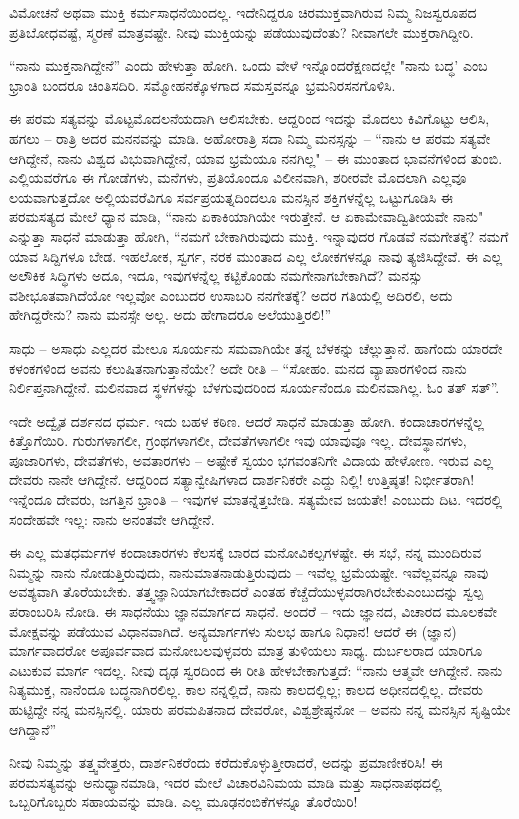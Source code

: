 \vskip 4pt

ವಿಮೋಚನೆ ಅಥವಾ ಮುಕ್ತಿ ಕರ್ಮಸಾಧನೆಯಿಂದಲ್ಲ. ಇದೇನಿದ್ದರೂ ಚಿರಮುಕ್ತವಾಗಿರುವ ನಿಮ್ಮ ನಿಜಸ್ವರೂಪದ ಪ್ರತಿಬೋಧವಷ್ಟೆ, ಸ್ಮರಣೆ ಮಾತ್ರವಷ್ಟೇ. ನೀವು ಮುಕ್ತಿಯನ್ನು ಪಡೆಯುವುದೆಂತು? ನೀವಾಗಲೇ ಮುಕ್ತರಾಗಿದ್ದೀರಿ.

\vskip 4pt

“ನಾನು ಮುಕ್ತನಾಗಿದ್ದೇನೆ” ಎಂದು ಹೇಳುತ್ತಾ ಹೋಗಿ. ಒಂದು ವೇಳೆ ಇನ್ನೊಂದರೆಕ್ಷಣದಲ್ಲೇ "ನಾನು ಬದ್ಧ' ಎಂಬ ಭ್ರಾಂತಿ ಬಂದರೂ ಚಿಂತಿಸದಿರಿ. ಸಮ್ಮೋಹನಕ್ಕೊಳಗಾದ ಸಮಸ್ತವನ್ನೂ ಭ್ರಮನಿರಸನಗೊಳಿಸಿ.

\vskip 4pt

ಈ ಪರಮ ಸತ್ಯವನ್ನು ಮೊಟ್ಟಮೊದಲನೆಯದಾಗಿ ಆಲಿಸಬೇಕು. ಆದ್ದರಿಂದ ಇದನ್ನು ಮೊದಲು ಕಿವಿಗೊಟ್ಟು ಆಲಿಸಿ, ಹಗಲು – ರಾತ್ರಿ ಅದರ ಮನನವನ್ನು ಮಾಡಿ. ಅಹೋರಾತ್ರಿ ಸದಾ ನಿಮ್ಮ ಮನಸ್ಸನ್ನು – “ನಾನು ಆ ಪರಮ ಸತ್ಯವೇ ಆಗಿದ್ದೇನೆ, ನಾನು ವಿಶ್ವದ ವಿಭುವಾಗಿದ್ದೇನೆ, ಯಾವ ಭ್ರಮೆಯೂ ನನಗಿಲ್ಲ" – ಈ ಮುಂತಾದ ಭಾವನೆಗಳಿಂದ ತುಂಬಿ. ಎಲ್ಲಿಯವರೆಗೂ ಈ ಗೋಡೆಗಳು, ಮನೆಗಳು, ಪ್ರತಿಯೊಂದೂ ವಿಲೀನವಾಗಿ, ಶರೀರವೇ ಮೊದಲಾಗಿ ಎಲ್ಲವೂ ಲಯವಾಗುತ್ತದೋ ಅಲ್ಲಿಯವರೆವಿಗೂ ಸರ್ವಪ್ರಯತ್ನದಿಂದಲೂ ಮನಸ್ಸಿನ ಶಕ್ತಿಗಳನ್ನೆಲ್ಲ ಒಟ್ಟುಗೂಡಿಸಿ ಈ ಪರಮಸತ್ಯದ ಮೇಲೆ ಧ್ಯಾನ ಮಾಡಿ, “ನಾನು ಏಕಾಕಿಯಾಗಿಯೇ ಇರುತ್ತೇನೆ. ಆ ಏಕಾಮೇವಾದ್ವಿತೀಯವೇ ನಾನು" ಎನ್ನುತ್ತಾ ಸಾಧನೆ ಮಾಡುತ್ತಾ ಹೋಗಿ, “ನಮಗೆ ಬೇಕಾಗಿರುವುದು ಮುಕ್ತಿ. ಇನ್ನಾವುದರ ಗೊಡವೆ ನಮಗೇತಕ್ಕೆ? ನಮಗೆ ಯಾವ ಸಿದ್ದಿಗಳೂ ಬೇಡ. ಇಹಲೋಕ, ಸ್ವರ್ಗ, ನರಕ ಮುಂತಾದ ಎಲ್ಲ ಲೋಕಗಳನ್ನೂ ನಾವು ತ್ಯಜಿಸಿದ್ದೇವೆ. ಈ ಎಲ್ಲ ಅಲೌಕಿಕ ಸಿದ್ಧಿಗಳು ಅದೂ, ಇದೂ, ಇವುಗಳನ್ನೆಲ್ಲ ಕಟ್ಟಿಕೊಂಡು ನಮಗೇನಾಗಬೇಕಾಗಿದೆ? ಮನಸ್ಸು ವಶೀಭೂತವಾಗಿದೆಯೋ ಇಲ್ಲವೋ ಎಂಬುದರ ಉಸಾಬರಿ ನನಗೇತಕ್ಕೆ? ಅದರ ಗತಿಯಲ್ಲಿ ಅದಿರಲಿ, ಅದು ಹೇಗಿದ್ದರೇನು? ನಾನು ಮನಸ್ಸೇ ಅಲ್ಲ. ಅದು ಹೇಗಾದರೂ ಅಲೆಯುತ್ತಿರಲಿ!”

\vskip 4pt

ಸಾಧು – ಅಸಾಧು ಎಲ್ಲದರ ಮೇಲೂ ಸೂರ್ಯನು ಸಮವಾಗಿಯೇ ತನ್ನ ಬೆಳಕನ್ನು ಚೆಲ್ಲುತ್ತಾನೆ. ಹಾಗೆಂದು ಯಾರದೇ ಕಳಂಕಗಳಿಂದ ಅವನು ಕಲುಷಿತನಾಗುತ್ತಾನೆಯೇ? ಅದೇ ರೀತಿ – “ಸೋಹಂ. ಮನದ ವ್ಯಾಪಾರಗಳಿಂದ ನಾನು ನಿರ್ಲಿಪ್ತನಾಗಿದ್ದೇನೆ. ಮಲಿನವಾದ ಸ್ಥಳಗಳನ್ನು ಬೆಳಗುವುದರಿಂದ ಸೂರ್ಯನೆಂದೂ ಮಲಿನವಾಗಿಲ್ಲ. ಓಂ ತತ್ ಸತ್”.

\vskip 4pt

ಇದೇ ಅದ್ವೈತ ದರ್ಶನದ ಧರ್ಮ. ಇದು ಬಹಳ ಕಠಿಣ. ಆದರೆ ಸಾಧನೆ ಮಾಡುತ್ತಾ ಹೋಗಿ. ಕಂದಾಚಾರಗಳನ್ನೆಲ್ಲ ಕಿತ್ತೊಗೆಯಿರಿ. ಗುರುಗಳಾಗಲೀ, ಗ್ರಂಥಗಳಾಗಲೀ, ದೇವತೆಗಳಾಗಲೀ ಇವು ಯಾವುವೂ ಇಲ್ಲ. ದೇವಸ್ಥಾನಗಳು, ಪೂಜಾರಿಗಳು, ದೇವತೆಗಳು, ಅವತಾರಗಳು – ಅಷ್ಟೇಕೆ ಸ್ವಯಂ ಭಗವಂತನಿಗೇ ವಿದಾಯ ಹೇಳೋಣ. ಇರುವ ಎಲ್ಲ ದೇವರು ನಾನೇ ಆಗಿದ್ದೇನೆ. ಆದ್ದರಿಂದ ಸತ್ಯಾನ್ವೇಷಿಗಳಾದ ದಾರ್ಶನಿಕರೇ ಎದ್ದು ನಿಲ್ಲಿ! ಉತ್ತಿಷ್ಠತ! ನಿರ್ಭೀತರಾಗಿ! ಇನ್ನೆಂದೂ ದೇವರು, ಜಗತ್ತಿನ ಭ್ರಾಂತಿ – ಇವುಗಳ ಮಾತನ್ನೆತ್ತಬೇಡಿ. ಸತ್ಯಮೇವ ಜಯತೇ! ಎಂಬುದು ದಿಟ. ಇದರಲ್ಲಿ ಸಂದೇಹವೇ ಇಲ್ಲ: ನಾನು ಅನಂತವೇ ಆಗಿದ್ದೇನೆ.

\vskip 4pt

ಈ ಎಲ್ಲ ಮತಧರ್ಮಗಳ ಕಂದಾಚಾರಗಳು ಕೆಲಸಕ್ಕೆ ಬಾರದ ಮನೋವಿಕಲ್ಪಗಳಷ್ಟೇ. ಈ ಸಭೆ, ನನ್ನ ಮುಂದಿರುವ ನಿಮ್ಮನ್ನು ನಾನು ನೋಡುತ್ತಿರುವುದು, ನಾನು\break ಮಾತನಾಡುತ್ತಿರುವುದು – ಇವೆಲ್ಲ ಭ್ರಮೆಯಷ್ಟೇ. ಇವೆಲ್ಲವನ್ನೂ ನಾವು ಅವಶ್ಯವಾಗಿ ತೊರೆಯಬೇಕು. ತತ್ತ್ವಜ್ಞಾನಿಯಾಗಬೇಕಾದರೆ ಎಂತಹ ಕೆಚ್ಚೆದೆಯುಳ್ಳವರಾಗಿರಬೇಕು\break ಎಂಬುದನ್ನು ಸ್ವಲ್ಪ ಪರಾಂಬರಿಸಿ ನೋಡಿ. ಈ ಸಾಧನೆಯು ಜ್ಞಾನಮಾರ್ಗದ ಸಾಧನೆ. ಅಂದರೆ – ಇದು ಜ್ಞಾನದ, ವಿಚಾರದ ಮೂಲಕವೇ ಮೋಕ್ಷವನ್ನು ಪಡೆಯುವ ವಿಧಾನವಾಗಿದೆ. ಅನ್ಯಮಾರ್ಗಗಳು ಸುಲಭ ಹಾಗೂ ನಿಧಾನ! ಆದರೆ ಈ (ಜ್ಞಾನ) ಮಾರ್ಗವಾದರೋ ಅಪೂರ್ವವಾದ ಮನೋಬಲವುಳ್ಳವರು ಮಾತ್ರ ತುಳಿಯಲು ಸಾಧ್ಯ. ದುರ್ಬಲರಾದ ಯಾರಿಗೂ ಎಟುಕುವ ಮಾರ್ಗ ಇದಲ್ಲ. ನೀವು ದೃಢ ಸ್ವರದಿಂದ ಈ ರೀತಿ ಹೇಳಬೇಕಾಗುತ್ತದೆ: “ನಾನು ಆತ್ಮವೇ ಆಗಿದ್ದೇನೆ. ನಾನು ನಿತ್ಯಮುಕ್ತ, ನಾನೆಂದೂ ಬದ್ಧನಾಗಿರಲಿಲ್ಲ. ಕಾಲ ನನ್ನಲ್ಲಿದೆ, ನಾನು ಕಾಲದಲ್ಲಿಲ್ಲ; ಕಾಲದ ಅಧೀನದಲ್ಲಿಲ್ಲ. ದೇವರು ಹುಟ್ಟಿದ್ದೇ ನನ್ನ ಮನಸ್ಸಿನಲ್ಲಿ. ಯಾರು ಪರಮಪಿತನಾದ ದೇವರೋ, ವಿಶ್ವಶ್ರೇಷ್ಠನೋ – ಅವನು ನನ್ನ ಮನಸ್ಸಿನ ಸೃಷ್ಟಿಯೇ ಆಗಿದ್ದಾನೆ''

\vskip 4pt

ನೀವು ನಿಮ್ಮನ್ನು ತತ್ತ್ವವೇತ್ತರು, ದಾರ್ಶನಿಕರೆಂದು ಕರೆದುಕೊಳ್ಳುತ್ತೀರಾದರೆ, ಅದನ್ನು ಪ್ರಮಾಣೀಕರಿಸಿ! ಈ ಪರಮಸತ್ಯವನ್ನು ಅನುಧ್ಯಾನಮಾಡಿ, ಇದರ ಮೇಲೆ ವಿಚಾರವಿನಿಮಯ ಮಾಡಿ ಮತ್ತು ಸಾಧನಾಪಥದಲ್ಲಿ ಒಬ್ಬರಿಗೊಬ್ಬರು ಸಹಾಯವನ್ನು ಮಾಡಿ. ಎಲ್ಲ ಮೂಢನಂಬಿಕೆಗಳನ್ನೂ ತೊರೆಯಿರಿ!

